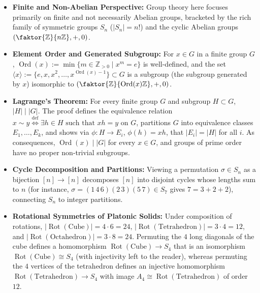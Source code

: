 \begin{overview}
\begin{itemize}
    \item \textbf{Finite and Non-Abelian Perspective:} Group theory here focuses primarily on finite and not necessarily Abelian groups, bracketed by the rich family of symmetric groups $S_n$ ($|S_n| = n!$) and the cyclic Abelian groups $(\faktor{\mathbb{Z}}{n\mathbb{Z}}, +, 0)$.
    \item \textbf{Element Order and Generated Subgroup:} For $x \in G$ in a finite group $G$, $\operatorname{Ord}(x) := \min \{ m \in \mathbb{Z}_{>0} \mid x^m = e \}$ is well-defined, and the set $\langle x \rangle := \{e, x, x^2, \dots, x^{\operatorname{Ord}(x)-1}\} \subset G$ is a subgroup (the subgroup generated by $x$) isomorphic to $(\faktor{\mathbb{Z}}{\operatorname{Ord}(x)\mathbb{Z}}, +, 0)$.
    \item \textbf{Lagrange's Theorem:} For every finite group $G$ and subgroup $H \subset G$, $|H| \mid |G|$. The proof defines the equivalence relation $x \sim y \stackrel{\text{def}}{\iff} \exists h \in H \text{ such that } xh = y$ on $G$, partitions $G$ into equivalence classes $E_1, \dots, E_k$, and shows via $\phi \colon H \to E_i$, $\phi(h) = xh$, that $|E_i| = |H|$ for all $i$. As consequences, $\operatorname{Ord}(x) \mid |G|$ for every $x \in G$, and groups of prime order have no proper non-trivial subgroups.
    \item \textbf{Cycle Decomposition and Partitions:} Viewing a permutation $\sigma \in S_n$ as a bijection $[n] \to [n]$ decomposes $[n]$ into disjoint cycles whose lengths sum to $n$ (for instance, $\sigma = (1\,4\,6)(2\,3)(5\,7) \in S_7$ gives $7 = 3 + 2 + 2$), connecting $S_n$ to integer partitions.
    \item \textbf{Rotational Symmetries of Platonic Solids:} Under composition of rotations, $|\operatorname{Rot}(\text{Cube})| = 4 \cdot 6 = 24$, $|\operatorname{Rot}(\text{Tetrahedron})| = 3 \cdot 4 = 12$, and $|\operatorname{Rot}(\text{Octahedron})| = 3 \cdot 8 = 24$. Permuting the $4$ long diagonals of the cube defines a homomorphism $\operatorname{Rot}(\text{Cube}) \to S_4$ that is an isomorphism $\operatorname{Rot}(\text{Cube}) \cong S_4$ (with injectivity left to the reader), whereas permuting the $4$ vertices of the tetrahedron defines an injective homomorphism $\operatorname{Rot}(\text{Tetrahedron}) \to S_4$ with image $A_4 \cong \operatorname{Rot}(\text{Tetrahedron})$ of order $12$.
\end{itemize}
\end{overview}